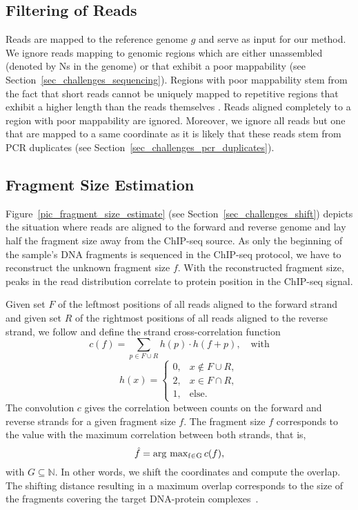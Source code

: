 \subsection{Filtering of Reads}
\label{sec_method_read_mapping}
Reads are mapped to the reference genome $g$ and serve as input for our method.
We ignore reads mapping to genomic regions which are either unassembled (denoted by Ns in the genome) or that exhibit a poor mappability (see Section~\ref{sec_challenges_sequencing}). 
Regions with poor mappability stem from the fact that short reads cannot be uniquely mapped to repetitive regions that exhibit a higher length than the reads themselves \citep{song2011}. 
Reads aligned completely to a region with poor mappability are ignored.
Moreover, we ignore all reads but one that are mapped to a same coordinate as it is likely that these reads stem from PCR duplicates (see Section~\ref{sec_challenges_pcr_duplicates}).



\subsection{Fragment Size Estimation}
\label{sec_method_frag_size}
Figure~\ref{pic_fragment_size_estimate} (see Section~\ref{sec_challenges_shift}) depicts the situation where reads are aligned to the forward and reverse genome and lay half the fragment size away from the ChIP-seq source.
As only the beginning of the sample's DNA fragments is sequenced in the ChIP-seq protocol, we have to reconstruct the unknown fragment size $f$.
With the reconstructed fragment size, peaks in the read distribution correlate to protein position in the ChIP-seq signal.

Given set $F$ of the leftmost positions of all reads aligned to the forward strand and given set $R$ of the rightmost positions of all reads aligned to the reverse strand, we follow \cite{mammana2013} and define the strand cross-correlation function
$$c(f) = \sum_{p \in F \cup R} h(p) \cdot h(f + p), \quad \text{with}$$ 
$$h(x) = \begin{cases} 
	    0, & x \notin F \cup R, \\ 
	    2, & x \in F \cap R, \\
	    1, & \text{else.}
	 \end{cases}$$
The convolution $c$ gives the correlation between counts on the forward and reverse strands for a given fragment size $f$. 
The fragment size $f$ corresponds to the value with the maximum correlation between both strands, that is, 
$$\hat{f}=\operatorname{\operatorname{arg}\,\operatorname{max}_{f \in G}} c(f),$$
with $G \subseteq \mathbb{N}$.
In other words, we shift the coordinates and compute the overlap. 
The shifting distance resulting in a maximum overlap corresponds to the size of the fragments covering the target DNA-protein complexes~\citep{kharchenko2008}.

